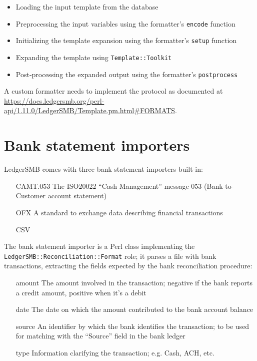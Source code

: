 \begin{itemize}
	\item Loading the input template from the database
	\item Preprocessing the input variables using the formatter's \texttt{encode}
		function
	\item Initializing the template expansion using the formatter's \texttt{setup} function
	\item Expanding the template using \texttt{Template::Toolkit}
	\item Post-processing the expanded output using the formatter's \texttt{postprocess}
\end{itemize}

A custom formatter needs to implement the protocol as documented at \url{https://docs.ledgersmb.org/perl-api/1.11.0/LedgerSMB/Template.pm.html#FORMATS}.

\section{Bank statement importers}

LedgerSMB comes with three bank statement importers built-in:

\begin{itemize}
	\item [CAMT.053] The \gls{ISO20022} ``Cash Management'' message 053
		(Bank-to-Customer account statement)
	\item [\gls{OFX}] A standard to exchange data describing financial transactions
	\item [CSV] 
\end{itemize}

The bank statement importer is a Perl class implementing the
\texttt{LedgerSMB::Reconciliation::Format} role; it parses a file with bank
transactions, extracting the fields expected by the bank reconciliation procedure:

\begin{itemize}
	\item [amount] The amount involved in the transaction; negative if the bank
		reports a credit amount, positive when it's a debit
	\item [date] The date on which the amount contributed to the bank account balance
	\item [source] An identifier by which the bank identifies the transaction; to be
		used for matching with the ``Source'' field in the bank ledger
	\item [type] Information clarifying the transaction; e.g. Cash, ACH, etc.
\end{itemize}

